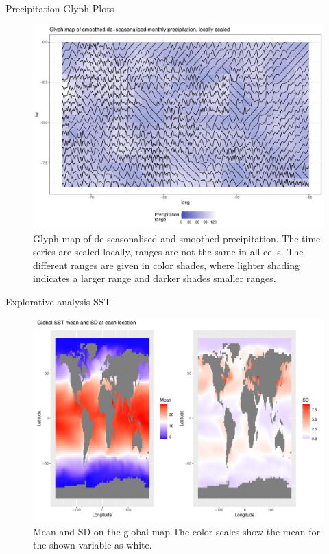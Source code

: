 \documentclass[
  ignorenonframetext,
]{beamer}
\begin{document}
\begin{frame}{Precipitation Glyph Plots}
\protect\hypertarget{precipitation-glyph-plots}{}
\begin{figure}

{\centering \includegraphics[width=0.75\linewidth]{ma-presentation_files/figure-beamer/glyph-scale-1} 

}

\caption{Glyph map of de-seasonalised and smoothed precipitation. The time series are scaled locally, ranges are not the same in all cells. The different ranges are given in color shades, where lighter shading indicates a larger range and darker shades smaller ranges.}\label{fig:glyph-scale}
\end{figure}
\end{frame}

\begin{frame}{Explorative analysis SST}
\protect\hypertarget{explorative-analysis-sst}{}
\begin{figure}

{\centering \includegraphics[width=0.5\linewidth]{ma-presentation_files/figure-beamer/mean-and-sd-sst-og-1} 

}

\caption{Mean and SD on the global map.The color scales show the mean for the shown variable as white.}\label{fig:mean-and-sd-sst-og}
\end{figure}
\end{frame}
\end{document}
